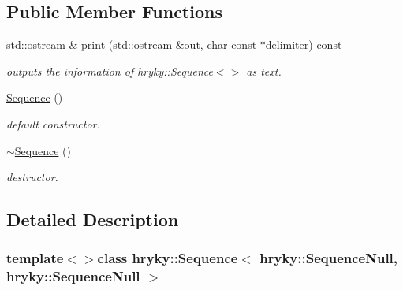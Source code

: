 \subsection*{Public Member Functions}
\begin{DoxyCompactItemize}
\item 
std\-::ostream \& \hyperlink{classhryky_1_1_sequence_3_01hryky_1_1_sequence_null_00_01hryky_1_1_sequence_null_01_4_a95486b345d94a3c06bd75d0baabe6b7d}{print} (std\-::ostream \&out, char const $\ast$delimiter) const 
\begin{DoxyCompactList}\small\item\em outputs the information of hryky\-::\-Sequence$<$$>$ as text. \end{DoxyCompactList}\item 
\hypertarget{classhryky_1_1_sequence_3_01hryky_1_1_sequence_null_00_01hryky_1_1_sequence_null_01_4_a1b3fc99067e3271517914d86b8a3713c}{\hyperlink{classhryky_1_1_sequence_3_01hryky_1_1_sequence_null_00_01hryky_1_1_sequence_null_01_4_a1b3fc99067e3271517914d86b8a3713c}{Sequence} ()}\label{classhryky_1_1_sequence_3_01hryky_1_1_sequence_null_00_01hryky_1_1_sequence_null_01_4_a1b3fc99067e3271517914d86b8a3713c}

\begin{DoxyCompactList}\small\item\em default constructor. \end{DoxyCompactList}\item 
\hypertarget{classhryky_1_1_sequence_3_01hryky_1_1_sequence_null_00_01hryky_1_1_sequence_null_01_4_ac20034fd4c0c82b81af43e60e8359e4a}{\hyperlink{classhryky_1_1_sequence_3_01hryky_1_1_sequence_null_00_01hryky_1_1_sequence_null_01_4_ac20034fd4c0c82b81af43e60e8359e4a}{$\sim$\-Sequence} ()}\label{classhryky_1_1_sequence_3_01hryky_1_1_sequence_null_00_01hryky_1_1_sequence_null_01_4_ac20034fd4c0c82b81af43e60e8359e4a}

\begin{DoxyCompactList}\small\item\em destructor. \end{DoxyCompactList}\end{DoxyCompactItemize}


\subsection{Detailed Description}
\subsubsection*{template$<$$>$class hryky\-::\-Sequence$<$ hryky\-::\-Sequence\-Null, hryky\-::\-Sequence\-Null $>$}


